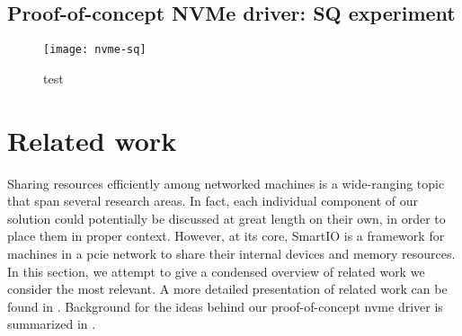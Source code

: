 \subsection{Proof-of-concept NVMe driver: SQ experiment}
\begin{figure}
    \centering
    \texttt{[image: nvme-sq]}
    \caption{test}
\end{figure}




\section{Related work}\label{sec:rw}
Sharing resources efficiently among networked machines is a wide-ranging topic that span several research areas.
%
In fact, each individual component of our solution could potentially be discussed at great length on their own, in order to place them in proper context.
%
However, at its core, SmartIO is a framework for machines in a \gls{pcie} network to share their internal devices and memory resources.
%
In this section, we attempt to give a condensed overview of related work we consider the most relevant.
%
A more detailed presentation of related work can be found in .
%
Background for the ideas behind our proof-of-concept \gls{nvme} driver is summarized in .


